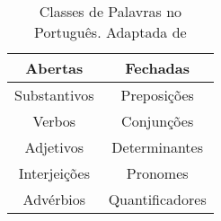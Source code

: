 \begin{table}[h!]
    \centering
    \begin{tabular}{|c|c|}
        \hline
        Abertas & Fechadas\\\hline
        Substantivos & Preposições\\\hline
        Verbos & Conjunções\\\hline
        Adjetivos & Determinantes\\\hline
        Interjeições & Pronomes\\\hline
        Advérbios & Quantificadores\\\hline
    \end{tabular}
    \caption[Classes de Palavras no Português]{Classes de Palavras no Português. Adaptada de }
    \label{tab:classesPalavras}
\end{table}


